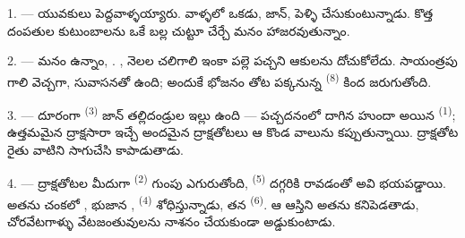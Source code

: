 %
%

\VUsaut{4.0mm}
\VUsaut{1.6mm}
\VUsaut{3.2mm}

\VUsaut{1.6mm}
\VUsaut{2.6mm}

\VUsaut{3.0mm}

1. --- యువకులు పెద్దవాళ్ళయ్యారు. వాళ్ళలో ఒకడు, జాన్, పెళ్ళి చేసుకుంటున్నాడు. కొత్త దంపతుల
కుటుంబాలను ఒకే బల్ల చుట్టూ చేర్చే  మనం హాజరవుతున్నాం.

2. --- మనం  ఉన్నాం, . ,
 నెలల చలిగాలి ఇంకా పల్లె పచ్చని ఆకులను దోచుకోలేదు. సాయంత్రపు గాలి వెచ్చగా,
సువాసనతో ఉంది; అందుకే భోజనం తోట పక్కనున్న  \textsuperscript{(8)} కింద
జరుగుతోంది.

3. --- దూరంగా  \textsuperscript{(3)} జాన్ తల్లిదండ్రుల ఇల్లు ఉంది — పచ్చదనంలో
దాగిన హుందా అయిన  \textsuperscript{(1)}; ఉత్తమమైన ద్రాక్షసారా ఇచ్చే అందమైన
ద్రాక్షతోటలు ఆ కొండ వాలును కప్పుతున్నాయి. ద్రాక్షతోట రైతు వాటిని సాగుచేసి కాపాడుతాడు.

4. --- ద్రాక్షతోటల మీదుగా  \textsuperscript{(2)} గుంపు ఎగురుతోంది,
 \textsuperscript{(5)} దగ్గరికి రావడంతో అవి భయపడ్డాయి. అతను చంకలో
, భుజాన ,  \textsuperscript{(4)}
శోధిస్తున్నాడు, తన  \textsuperscript{(6)}. ఆ ఆస్తిని అతను కనిపెడతాడు,
చోరవేటగాళ్ళు వేటజంతువులను నాశనం చేయకుండా అడ్డుకుంటాడు.

